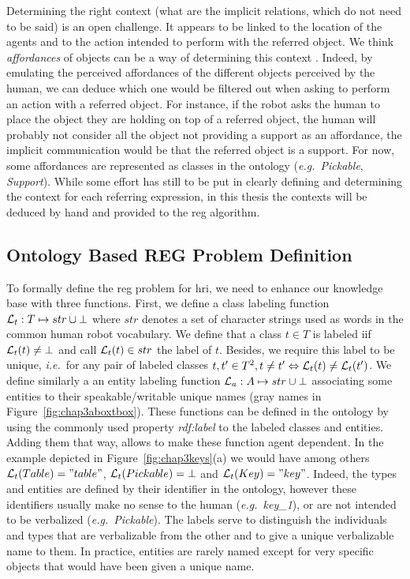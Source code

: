\documentclass[a4paper,11pt,twoside]{StyleThese}
\begin{document}
\begin{enumerate}

Determining the right context (what are the implicit relations, which do not need to be said) is an open challenge. It appears to be linked to the location of the agents and to the action intended to perform with the referred object. We think \textit{affordances} of objects can be a way of determining this context \cite{gibson2014ecological, norman2013design}. Indeed, by emulating the perceived affordances of the different objects perceived by the human, we can deduce which one would be filtered out when asking to perform an action with a referred object. For instance, if the robot asks the human to place the object they are holding on top of a referred object, the human will probably not consider all the object not providing a support as an affordance, the implicit communication would be that the referred object is a support. For now, some affordances are represented as classes in the ontology (\textit{e.g.}~\textit{Pickable}, \textit{Support}). While some effort has still to be put in clearly defining and determining the context for each referring expression, in this thesis the contexts will be deduced by hand and provided to the \acrshort{reg} algorithm.

\end{enumerate}

\subsection{Ontology Based REG Problem Definition}
To formally define the \acrshort{reg} problem for \acrshort{hri}, we need to enhance our knowledge base with three functions.
First, we define a class labeling function $\mathcal{L}_t: T \mapsto str \cup \bot$ where $str$ denotes a set of character strings used as words in the common human robot vocabulary. We define that a class $t \in T$ is labeled iif $\mathcal{L}_t(t) \neq \bot$ and call $\mathcal{L}_t(t) \in str$ the label of $t$. Besides, we require this label to be unique, \textit{i.e.}~for any pair of labeled classes $t, t' \in T^2, t \neq t' \Leftrightarrow \mathcal{L}_t(t) \neq \mathcal{L}_t(t')$. We define similarly a an entity labeling function $\mathcal{L}_a: A \mapsto str \cup \bot$ associating some entities to their speakable/writable unique names (gray names in Figure~\ref{fig:chap3aboxtbox}). These functions can be defined in the ontology by using the commonly used property \textit{rdf:label} to the labeled classes and entities. Adding them that way, allows to make these function agent dependent. In the example depicted in Figure~\ref{fig:chap3keys}(a) we would have among others $\mathcal{L}_t(Table) = "table"$, $\mathcal{L}_t(Pickable) = \bot$ and $\mathcal{L}_t(Key) = "key"$. Indeed, the types and entities are defined by their identifier in the ontology, however these identifiers usually make no sense to the human (\textit{e.g.}~\textit{key\_1}), or are not intended to be verbalized (\textit{e.g.}~\textit{Pickable}). The labels serve to distinguish the individuals and types that are verbalizable from the other and to give a unique verbalizable name to them. In practice, entities are rarely named except for very specific objects that would have been given a unique name.
\end{document}
